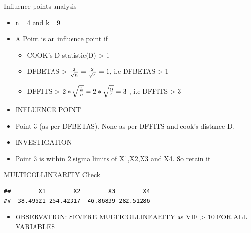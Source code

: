\documentclass[
  ignorenonframetext,
]{beamer}
\providecommand{\tightlist}{%
  \setlength{\itemsep}{0pt}\setlength{\parskip}{0pt}}
\begin{document}
\begin{frame}{Influence points analysis}
\protect\hypertarget{influence-points-analysis}{}
\begin{itemize}
\item
  n= 4 and k= 9
\item
  A Point is an influence point if

  \begin{itemize}
  \item
    COOK's D-statistic(D) \textgreater{} 1
  \item
    DFBETAS \textgreater{}
    \({2 \over \sqrt{n}} = {2 \over \sqrt{4}} = 1\), i.e DFBETAS
    \textgreater{} 1
  \item
    DFFITS \textgreater{}
    \(2 * \sqrt{ k \over n} = 2 * \sqrt{9 \over 4} = 3\) , i.e DFFITS
    \textgreater{} 3
  \end{itemize}
\item
  INFLUENCE POINT
\item
  Point 3 (as per DFBETAS). None as per DFFITS and cook's distance D.
\item
  INVESTIGATION
\item
  Point 3 is within 2 sigma limits of X1,X2,X3 and X4. So retain it
\end{itemize}
\end{frame}

\begin{frame}[fragile]{MULTICOLLINEARITY Check}
\protect\hypertarget{multicollinearity-check}{}
\begin{verbatim}
##        X1        X2        X3        X4 
##  38.49621 254.42317  46.86839 282.51286
\end{verbatim}

\begin{itemize}
\tightlist
\item
  OBSERVATION: SEVERE MULTICOLLINEARITY as VIF \textgreater{} 10 FOR ALL
  VARIABLES
\end{itemize}
\end{frame}
\end{document}

